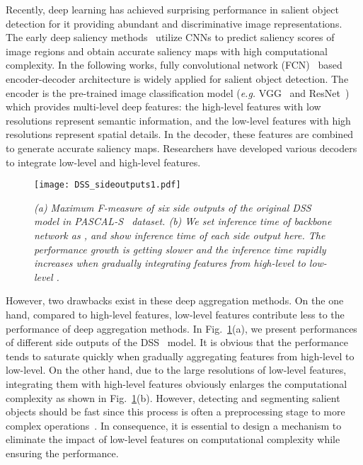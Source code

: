 \documentclass[10pt,twocolumn,letterpaper]{article}
\begin{document}
Recently, deep learning has achieved surprising performance in salient object detection for it providing abundant and discriminative
image representations. The early deep saliency methods~\cite{2016ELD,2015MDF,2015LEGS} utilize CNNs to predict saliency scores of image regions and obtain accurate saliency maps with high computational complexity. In the following works, fully convolutional network (FCN)~\cite{2015FCN} based encoder-decoder architecture is widely applied for salient object detection. The encoder is the pre-trained image classification model (\emph{e.g.} VGG~\cite{2014VGG} and ResNet~\cite{2016ResNet}) which provides multi-level deep features: the high-level features with low resolutions represent semantic information, and the low-level features with high resolutions represent spatial details. In the decoder, these features are combined to generate accurate saliency maps. Researchers have developed various decoders~\cite{2018DSS,2016DCL,2016DHS,2018PiCANet,2017NLDF,2018BMPM,2017Amulet} to integrate low-level and high-level features.

\begin{figure}[t]
\centering
\texttt{[image: DSS\_sideoutputs1.pdf]}
\caption{\small \em (a) Maximum F-measure of six side outputs of the original DSS~\cite{2018DSS} model in PASCAL-S~\cite{Dataset-PASCAL-S} dataset. (b) We set inference time of backbone network as , and show inference time of each side output here. The performance growth is getting slower and the inference time rapidly increases when gradually integrating features from high-level  to low-level .}
\label{DSS_SideOutputs}
\end{figure}

However, two drawbacks exist in these deep aggregation methods. On the one hand, compared to high-level features, low-level features contribute less to the performance of deep aggregation methods. In Fig.~\ref{DSS_SideOutputs}(a), we present performances of different side outputs of the DSS~\cite{2018DSS} model. It is obvious that the performance tends to saturate quickly when gradually aggregating features from high-level to low-level. On the other hand, due to the large resolutions of low-level features, integrating them with high-level features obviously enlarges the computational complexity as shown in Fig.~\ref{DSS_SideOutputs}(b). However, detecting and segmenting salient objects should be fast since this process is often a preprocessing stage to more complex operations~\cite{SalObjSurvey}. In consequence, it is essential to design a mechanism to eliminate the impact of low-level features on computational complexity while ensuring the performance.
\end{document}
